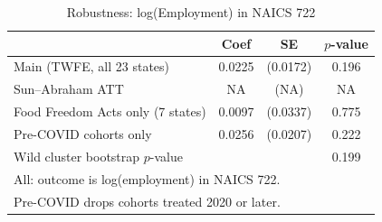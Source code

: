 \begin{table}[t]
\centering
\caption{Robustness: log(Employment) in NAICS 722}
\label{tab:robustness}
\begin{tabular}{lccc}
\toprule
 & Coef & SE & $p$-value \\
\midrule
Main (TWFE, all 23 states) & 0.0225 & (0.0172) & 0.196 \\
Sun--Abraham ATT & NA & (NA) & NA \\
Food Freedom Acts only (7 states) & 0.0097 & (0.0337) & 0.775 \\
Pre-COVID cohorts only & 0.0256 & (0.0207) & 0.222 \\
Wild cluster bootstrap $p$-value & & & 0.199 \\
\midrule
\multicolumn{4}{l}{\footnotesize All: outcome is log(employment) in NAICS 722.} \\
\multicolumn{4}{l}{\footnotesize Pre-COVID drops cohorts treated 2020 or later.} \\
\bottomrule
\end{tabular}
\end{table}

